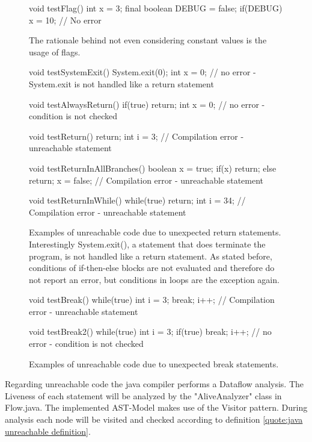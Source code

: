 \begin{figure}[h!]
	\begin{JavaCode}
void testFlag() {
	int x = 3;
	final boolean DEBUG = false;
	if(DEBUG) x = 10; // No error
}\end{JavaCode}
	\caption{The rationale behind not even considering constant values is the usage of flags.}
	\label{code:java flags}
\end{figure}

\begin{figure}[h!]
	\begin{JavaCode}
void testSystemExit() {
	System.exit(0);
	int x = 0; // no error - System.exit is not handled like a return statement
}

void testAlwaysReturn() {
	if(true) return;
	int x = 0; // no error - condition is not checked
}

void testReturn() {
	return;
	int i = 3; // Compilation error - unreachable statement
}

void testReturnInAllBranches() {
	boolean x = true;
	if(x) return;
	else return;
	x = false; // Compilation error - unreachable statement
}

void testReturnInWhile() {
	while(true) {
		return;
	}
	int i = 34; // Compilation error - unreachable statement
}\end{JavaCode}
	\caption{Examples of unreachable code due to unexpected return statements. Interestingly System.exit(), a statement that does terminate the program, is not handled like a return statement. As stated before, conditions of if-then-else blocks are not evaluated and therefore do not report an error, but conditions in loops are the exception again. }
	\label{code:java unexpected return}
\end{figure}

\begin{figure}[h!]
	\begin{JavaCode}
void testBreak() {
	while(true) {
		int i = 3;
		break; 
		i++; // Compilation error - unreachable statement
	}
}

void testBreak2() {
	while(true) {
		int i = 3;
		if(true) break; 
		i++; // no error - condition is not checked
	}
}\end{JavaCode}
	\caption{Examples of unreachable code due to unexpected break statements.}
	\label{code:java unexpected break}
\end{figure}

Regarding unreachable code the java compiler performs a Dataflow analysis. The Liveness of each statement will be analyzed by the "AliveAnalyzer" class in Flow.java. The implemented AST-Model makes use of the Visitor pattern. During analysis each node will be visited and checked according to definition \ref{quote:java unreachable definition}.



